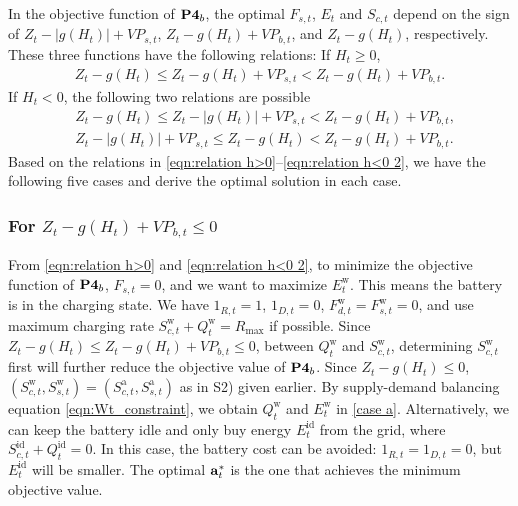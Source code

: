 \documentclass[journal]{IEEEtran}
\def\abf{{\bf a}}
\def\w{\textrm{w}}
\begin{document}
In the objective function  of $\text{\bf P4}_b$,  the optimal  $F_{s,t}$, $E_t$ and $S_{c,t}$ depend on the sign of $Z_t-|g(H_t)|+VP_{s,t}$, $Z_t-g(H_t)+VP_{b,t}$, and $Z_t-g(H_t)$, respectively. These three functions have the following relations: If $H_t\geq0$,
{%
\begin{align}\label{eqn:relation h>0}
Z_t-g(H_t) \le Z_t-g(H_t)+VP_{s,t}<Z_t-g(H_t)+VP_{b,t}.
\end{align}
}
If $H_t<0$, the following two relations are possible
\begin{align}
&Z_t-g(H_t)\le Z_t-|g(H_t)|+VP_{s,t}<Z_t-g(H_t)+VP_{b,t},\label{eqn:relation h<0 1}\\
&Z_t-|g(H_t)|+VP_{s,t}\le Z_t-g(H_t)<Z_t-g(H_t)+VP_{b,t}.\label{eqn:relation h<0 2}
\end{align}
Based on the relations in \eqref{eqn:relation h>0}--\eqref{eqn:relation h<0 2}, we have the following five cases and derive the optimal solution in each case.
\subsubsection{For $Z_t-g(H_t)+VP_{b,t}\leq0$} From \eqref{eqn:relation h>0} and \eqref{eqn:relation h<0 2}, to minimize the objective function of   $\text{\bf P4}_b$, $F_{s,t}=0$, and we want to maximize $E^\w_t$.
This means the battery is in the charging state. We have $1_{R,t}=1$,  $1_{D,t}=0$, $F^\w_{d,t}=F^\w_{s,t}=0$, and use maximum charging rate $S^\w_{c,t}+Q^\w_t=R_{\max}$ if possible.
Since $Z_t-g(H_t)\leq Z_t-g(H_t)+VP_{b,t}\le 0$, between $Q^\w_t$ and $S^\w_{c,t}$,  determining $S^\w_{c,t}$ first will further reduce the objective value of $\text{\bf P4}_b$. Since $Z_t-g(H_t)\le 0$,  $(S^\w_{c,t},S^\w_{s,t})=(S^\text{a}_{c,t},S^\text{a}_{s,t})$ as in S2) given earlier.  By supply-demand balancing equation \eqref{eqn:Wt_constraint}, we obtain $Q^\w_t$ and $E^\w_t$ in \eqref{case a}.
Alternatively, we can keep the battery idle and only buy energy $E_t^\textrm{id}$ from the grid, where $S_{c,t}^\textrm{id}+Q_t^\textrm{id}=0$. In this case,  the battery cost can be avoided: $1_{R,t}=1_{D,t}=0$, but $E_t^\textrm{id}$ will be smaller. The optimal $\abf^*_t$ is the one that achieves the minimum objective value.
\end{document}
